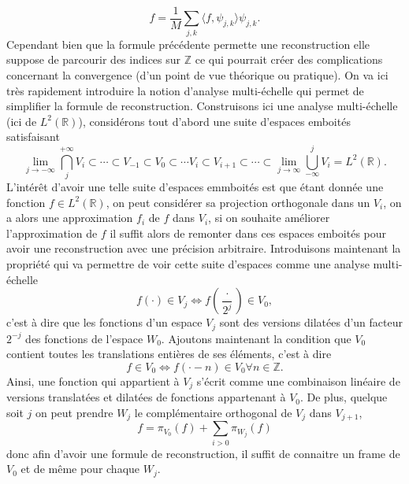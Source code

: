 \begin{equation}
	f = \frac{1}{M} \sum_{j,k} \langle f, \psi_{j,k}\rangle \psi_{j,k}.
\end{equation}
Cependant bien que la formule précédente permette une reconstruction elle suppose de parcourir des indices sur $\mathbb{Z}$ ce qui pourrait créer des complications concernant la convergence (d'un point de vue théorique ou pratique).
On va ici très rapidement introduire la notion d'analyse multi-échelle qui permet de simplifier la formule de reconstruction.
Construisons ici une analyse multi-échelle (ici de $L^2(\mathbb{R})$), considérons tout d'abord une suite d'espaces emboités satisfaisant 
\begin{equation*}
	\lim_{j\to -\infty} \bigcap_{j}^{+\infty} V_i \subset \cdots \subset V_{-1} \subset V_0 \subset \cdots V_i \subset V_{i+1} \subset \cdots \subset \lim_{j\to \infty} \bigcup_{-\infty}^{j} V_i = L^2(\mathbb{R}).  
\end{equation*}
L'intérêt d'avoir une telle suite d'espaces emmboités est que étant donnée une fonction $f\in L^2(\mathbb{R})$, on peut considérer sa projection orthogonale dans un $V_i$, on a alors une approximation $f_i$ de $f$ dans $V_i$, si on souhaite améliorer l'approximation de $f$ il suffit alors de remonter dans ces espaces emboités pour avoir une reconstruction avec une précision arbitraire.
Introduisons maintenant la propriété qui va permettre de voir cette suite d'espaces comme une analyse multi-échelle
\begin{equation}
	f(\cdot) \in V_j \iff f(\frac{\cdot}{2^j}) \in V_0,
\end{equation}
c'est à dire que les fonctions d'un espace $V_j$ sont des versions dilatées d'un facteur $2^{-j}$ des fonctions de l'espace $W_0$.
Ajoutons maintenant la condition que $V_0$ contient toutes les translations entières de ses éléments, c'est à dire
\begin{equation}
	f \in V_0 \iff f(\cdot - n) \in V_0 \forall n \in \mathbb{Z}.
\end{equation}
Ainsi, une fonction qui appartient à $V_j$ s'écrit comme une combinaison linéaire de versions translatées et dilatées de fonctions appartenant à $V_0$.
De plus, quelque soit $j$ on peut prendre $W_j$ le complémentaire orthogonal de $V_j$ dans $V_{j+1}$, 
\begin{equation}
	f = \pi_{V_0}(f) +\sum_{i>0} \pi_{W_j}(f) 
\end{equation}
donc afin d'avoir une formule de reconstruction, il suffit de connaitre un frame de $V_0$ et de même pour chaque $W_j$. 
